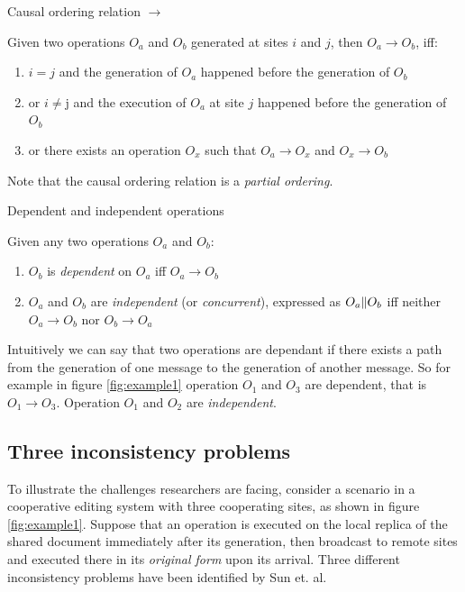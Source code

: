 \documentclass[11pt,a4paper]{article}
\begin{document}
\begin{defn}
Causal ordering relation $\rightarrow$
\end{defn}

Given two operations $O_{a}$ and $O_{b}$ generated at sites $i$ and $j$, then $O_{a}\rightarrow O_{b}$, iff:
\begin{enumerate}
 \item $i=j$ and the generation of $O_{a}$ happened before the generation of 
       $O_{b}$
 \item or $i \neq $j and the execution of $O_{a}$ at site $j$ happened before 
       the generation of $O_{b}$
 \item or there exists an operation $O_{x}$ such that $O_{a}\rightarrow O_{x}$
       and $O_{x}\rightarrow O_{b}$
\end{enumerate}

Note that the causal ordering relation is a \emph{partial ordering}.

\begin{defn}
Dependent and independent operations
\end{defn}

Given any two operations $O_{a}$ and $O_{b}$:
\begin{enumerate}
 \item $O_{b}$ is \emph{dependent} on $O_{a}$ iff $O_{a} \rightarrow O_{b}$
 \item $O_{a}$ and $O_{b}$ are \emph{independent} (or \emph{concurrent}), 
       expressed as $O_{a} \Arrowvert O_{b}$ iff neither 
       $O_{a}\rightarrow O_{b}$ nor $O_{b}\rightarrow O_{a}$
\end{enumerate}

Intuitively we can say that two operations are dependant if there exists a path from the generation of one message to the generation of another message. So for example in figure \ref{fig:example1} operation $O_{1}$ and $O_{3}$ are dependent, that is $O_{1}\rightarrow O_{3}$. Operation $O_{1}$ and $O_{2}$ are \emph{independent}. 


\subsection{Three inconsistency problems}
\label{constraints}

To illustrate the challenges researchers are facing, consider a scenario in a cooperative editing system with three cooperating sites, as shown in figure \ref{fig:example1}. Suppose that an operation is executed on the local replica of the shared document immediately after its generation, then broadcast to remote sites and executed there in its \emph{original form} upon its arrival.
Three different inconsistency problems have been identified by {Sun et. al}\cite{sun98a}.
\end{document}

